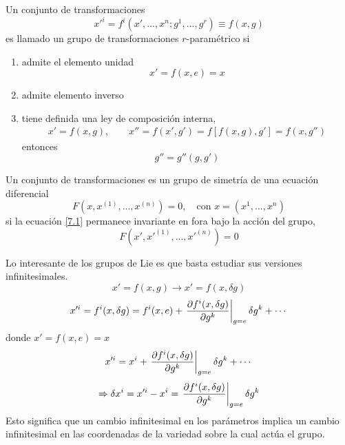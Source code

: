 \begin{defi}
	Un conjunto de transformaciones
	\begin{equation}
  x'^{i}=f^{i}(x',...,x^n;g^1,...,g^r)\equiv f(x,g)
\end{equation}
es llamado un grupo de transformaciones $r$-paramétrico si
\begin{enumerate}
	\item admite el elemento unidad
\begin{equation}
  x'=f(x,e)=x
\end{equation}
\item admite elemento inverso
\item tiene definida una ley de composición interna,
\begin{align}
  x'=f(x,g),\qquad x''=f(x',g')=f[f(x,g),g']=f(x,g'')
\end{align}
entonces 
\begin{equation}
  \boxed{g''=g''(g,g')}
\end{equation}
\end{enumerate}
\end{defi}
%
\begin{defi}
	Un conjunto de transformaciones es un grupo de simetría de una ecuación diferencial
	\begin{equation}\label{7.1}
  F(x,x^{(1)},...,x^{(n)})=0,\quad \text{con }x=(x^1,...,x^n)
\end{equation}
si la ecuación \eqref{7.1} permanece invariante en fora bajo la acción del grupo,
\begin{equation}
  F(x',x'^{(1)},...,x'^{(n)})=0
\end{equation}
\end{defi}

Lo interesante de los grupos de Lie es que basta estudiar sus versiones infinitesimales.
\begin{equation}
  x'=f(x,g)\to x'=f(x,\delta g)
\end{equation}
\begin{equation}
  x'^{i}=f^{i}(x,\delta g)=f^{i}(x,e)+\eval{\pdv{f^{i}(x,\delta g)}{g^k}}_{g=e}\delta g^k+\cdots
\end{equation}
donde $x'=f(x,e)=x$
\begin{equation}
  x'^{i}=x^{i}+\eval{\pdv{f^{i}(x,\delta g)}{g^k}}_{g=e}\delta g^k+\cdots
\end{equation}
\begin{equation}
  \Rightarrow \delta x^{i}=x'^{i}-x^{i}=\eval{\pdv{f^{i}(x,\delta g)}{g^k}}_{g=e}\delta g^k
\end{equation}
Esto significa que un cambio infinitesimal en los parámetros implica un cambio infinitesimal en las coordenadas de la variedad sobre la cual actúa el grupo.





















